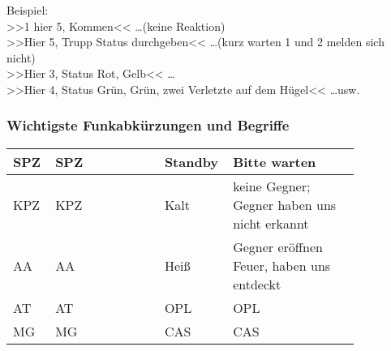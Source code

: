 	Beispiel:\\
	>>1 hier 5, Kommen<< \dots (keine Reaktion)\\  
	>>Hier 5, Trupp Status durchgeben<< \dots (kurz warten 1 und 2 melden sich nicht)\\ 
	>>Hier 3, Status Rot, Gelb<< \dots\\ 
	>>Hier 4, Status Grün, Grün, zwei Verletzte auf dem Hügel<< \dots usw.

\subsubsection{Wichtigste Funkabkürzungen und Begriffe}
	\begin{longtable}{p{0.1\linewidth}p{0.25\linewidth}p{0.05\linewidth}p{0.1\linewidth}p{0.35\linewidth}} 
		\toprule
		\acs{SPZ}	& \acl{SPZ}	&& Standby	& Bitte warten \hfil\\ 
		\midrule
		\acs{KPZ}	& \acl{KPZ}	&& Kalt		& keine Gegner; Gegner haben uns nicht erkannt\\ 
		\acs{AA}	& \acl{AA}	&& Heiß 		& Gegner eröffnen Feuer, haben uns entdeckt \\ 
		\acs{AT}	& \acl{AT}	&& \acs{OPL}	& \acl{OPL} \\ 
		\acs{MG}	& \acl{MG}	&& \acs{CAS}	& \acl{CAS} \\ 
		\bottomrule
	\end{longtable}


